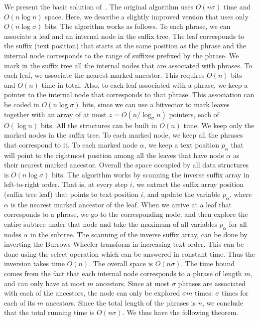 \documentclass[11pt,runningheads]{llncs}
\begin{document}
We present the basic solution of~\cite{fnv2013}. 
The original algorithm uses $O(n\sigma)$ time and 
$O(n\log n)$ space. Here, we describe a slightly improved 
version that uses only $O(n\log\sigma)$ bits. 
The algorithm works as follows. To each phrase, we can associate a leaf 
and an internal node in the suffix tree. 
The leaf corresponds to the suffix (text position) that starts at the same 
position as the phrase and the internal node corresponds to the 
range of suffixes prefixed by the phrase. We mark in the suffix 
tree all the internal nodes that are associated with phrases. 
To each leaf, we associate the nearest marked ancestor. This requires $O(n)$ bits 
and $O(n)$ time in total. Also, to each leaf associated with a phrase, we keep a pointer 
to the internal node that corresponds to that phrase. This association can be 
coded in $O(n\log\sigma)$ bits, since we can use a bitvector to 
mark leaves together with an array of at most $z = O(n/\log_\sigma n)$
pointers, each of $O(\log n)$ bits. All the structures can be built 
in $O(n)$ time. 
We keep only the marked nodes in the suffix tree. To each 
marked node, we keep all the phrases that correspond to it. 
To each marked node $\alpha$, we keep a text position $p_\alpha$
that will point to the rightmost position among all the leaves that 
have node $\alpha$ as their nearest marked ancestor. 
Overall the space occupied by all data structures is $O(n\log\sigma)$
bits. The algorithm works by scanning the inverse suffix array
in left-to-right order. That is, at every step $i$, we extract the 
suffix array position (suffix tree leaf) that points to text position $i$,
and update the variable $p_\alpha$, where $\alpha$ is the nearest marked ancestor 
of the leaf. When we arrive at a leaf that corresponds to a phrase,  
we go to the corresponding node, and then explore the entire subtree under that 
node and take the maximum of all variables $p_\alpha$ for all nodes $\alpha$
in the subtree. The scanning of the inverse suffix array, can be done 
by inverting the Burrows-Wheeler transform in increasing text order. 
This can be done using the select operation which can be answered 
in constant time. Thus the inversion takes time $O(n)$. 
The overall space is $O(n\sigma)$. 
The time bound comes from the 
fact that each internal node corresponds to a phrase of length $m$, and can only 
have at most $m$ ancestors. Since at most $\sigma$ phrases are associated with each 
of the ancestors, the node can only be explored $\sigma m$ times: $\sigma$ times 
for each of its $m$ ancestors. Since the total length of the phrases is $n$, 
we conclude that the total running time is $O(n\sigma)$. 
We thus have the following theorem.
\end{document}
